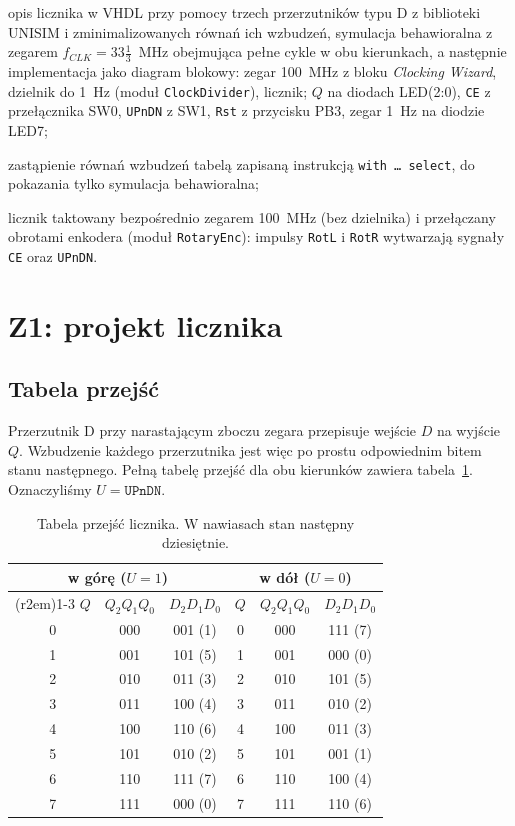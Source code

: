 \documentclass[11pt,a4paper]{article}
\begin{document}
\begin{description}[leftmargin=2.2em,style=sameline]
  \item[Z1] opis licznika w VHDL przy pomocy trzech przerzutników typu D z biblioteki UNISIM i zminimalizowanych równań ich wzbudzeń, symulacja behawioralna z zegarem $f_{CLK} = 33\tfrac{1}{3}$~MHz obejmująca pełne cykle w obu kierunkach, a następnie implementacja jako diagram blokowy: zegar 100~MHz z bloku \emph{Clocking Wizard}, dzielnik do 1~Hz (moduł \texttt{ClockDivider}), licznik; $Q$ na diodach LED(2:0), \texttt{CE} z przełącznika SW0, \texttt{UPnDN} z SW1, \texttt{Rst} z przycisku PB3, zegar 1~Hz na diodzie LED7;
  \item[Z2] zastąpienie równań wzbudzeń tabelą zapisaną instrukcją \texttt{with \dots\ select}, do pokazania tylko symulacja behawioralna;
  \item[Z3] licznik taktowany bezpośrednio zegarem 100~MHz (bez dzielnika) i przełączany obrotami enkodera (moduł \texttt{RotaryEnc}): impulsy \texttt{RotL} i \texttt{RotR} wytwarzają sygnały \texttt{CE} oraz \texttt{UPnDN}.
\end{description}

\section{Z1: projekt licznika}

\subsection{Tabela przejść}

Przerzutnik D przy narastającym zboczu zegara przepisuje wejście $D$ na wyjście $Q$. Wzbudzenie każdego przerzutnika jest więc po prostu odpowiednim bitem stanu następnego. Pełną tabelę przejść dla obu kierunków zawiera tabela~\ref{tab:przejscia}. Oznaczyliśmy $U = \texttt{UPnDN}$.

\begin{table}[H]
\centering
\small
\begin{tabular}{ccc@{\hspace{3em}}ccc}
\toprule
\multicolumn{3}{c}{w górę ($U = 1$)} & \multicolumn{3}{c}{w dół ($U = 0$)}\\
\cmidrule(r{2em}){1-3}\cmidrule{4-6}
$Q$ & $Q_2Q_1Q_0$ & $D_2D_1D_0$ & $Q$ & $Q_2Q_1Q_0$ & $D_2D_1D_0$\\
\midrule
0 & 000 & 001 (1) & 0 & 000 & 111 (7)\\
1 & 001 & 101 (5) & 1 & 001 & 000 (0)\\
2 & 010 & 011 (3) & 2 & 010 & 101 (5)\\
3 & 011 & 100 (4) & 3 & 011 & 010 (2)\\
4 & 100 & 110 (6) & 4 & 100 & 011 (3)\\
5 & 101 & 010 (2) & 5 & 101 & 001 (1)\\
6 & 110 & 111 (7) & 6 & 110 & 100 (4)\\
7 & 111 & 000 (0) & 7 & 111 & 110 (6)\\
\bottomrule
\end{tabular}
\caption{Tabela przejść licznika. W nawiasach stan następny dziesiętnie.}
\label{tab:przejscia}
\end{table}
\end{document}
